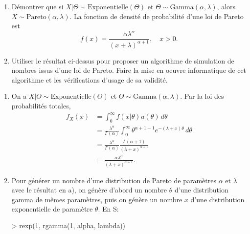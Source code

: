 \begin{exercice}
  \begin{enumerate}
  \item Démontrer que si $X|\Theta \sim \text{Exponentielle}(\Theta)$
    et $\Theta \sim \text{Gamma}(\alpha, \lambda)$, alors $X \sim
    \text{Pareto}(\alpha, \lambda)$. La fonction de densité de
    probabilité d'une loi de Pareto est
    \begin{displaymath}
      f(x) = \frac{\alpha \lambda^\alpha}{(x + \lambda)^{\alpha + 1}},
      \quad x > 0.
    \end{displaymath}
  \item Utiliser le résultat ci-dessus pour proposer un algorithme de
    simulation de nombres issus d'une loi de Pareto. Faire la mise en
    oeuvre informatique de cet algorithme et les vérifications d'usage
    de sa validité.
  \end{enumerate}
  \begin{sol}
    \begin{enumerate}
    \item On a $X|\Theta \sim \text{Exponentielle}(\Theta)$ et $\Theta
      \sim \text{Gamma}(\alpha, \lambda)$. Par la loi des probabilités
      totales,
      \begin{align*}
        f_{X}(x)
        &= \int_0^\infty f(x|\theta) u(\theta)\, d\theta  \\
        &= \frac{\lambda^\alpha}{\Gamma(\alpha)} \int_0^\infty
        \theta^{\alpha + 1 - 1} e^{-(\lambda + x) \theta}\, d\theta  \\
        &= \frac{\lambda^\alpha}{\Gamma(\alpha)}
        \frac{\Gamma(\alpha + 1)}{(\lambda + x)^{\alpha +1}} \\
        &= \frac{\alpha \lambda^\alpha}{(\lambda + x)^{\alpha +1}}.
      \end{align*}
    \item Pour générer un nombre d'une distribution de Pareto de
      paramètres $\alpha$ et $\lambda$ avec le résultat en a), on
      génère d'abord un nombre $\theta$ d'une distribution gamma de
      mêmes paramètres, puis on génère un nombre $x$ d'une
      distribution exponentielle de paramètre $\theta$. En S:
\begin{Schunk}
\begin{Sinput}
> rexp(1, rgamma(1, alpha, lambda))
\end{Sinput}
\end{Schunk}
    \end{enumerate}
  \end{sol}
\end{exercice}

